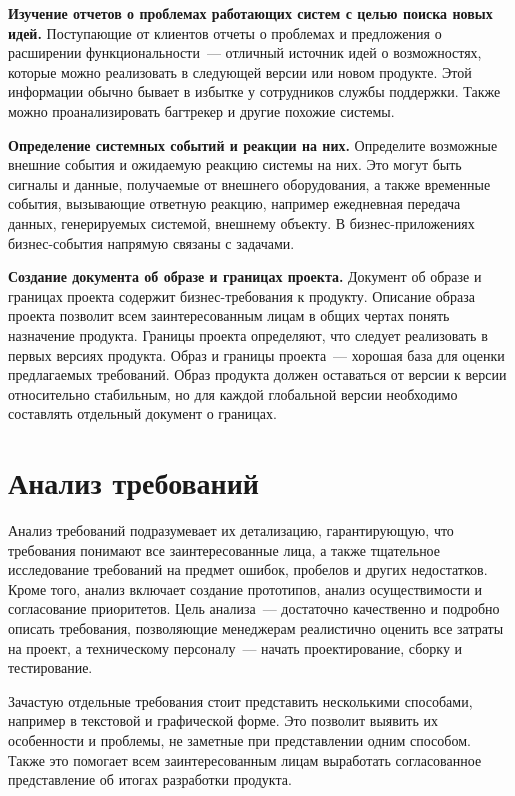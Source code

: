 \documentclass{../../text-style}
\begin{document}
\textbf{Изучение отчетов о проблемах работающих систем с целью поиска новых идей.} Поступающие от клиентов отчеты о проблемах и предложения о расширении функциональности~--- отличный источник идей о возможностях, которые можно реализовать в следующей версии или новом продукте. Этой информации обычно бывает в избытке у сотрудников службы поддержки. Также можно проанализировать багтрекер и другие похожие системы.

\textbf{Определение системных событий и реакции на них.} Определите возможные внешние события и ожидаемую реакцию системы на них. Это могут быть сигналы и данные, получаемые от внешнего оборудования, а также временные события, вызывающие ответную реакцию, например ежедневная передача данных, генерируемых системой, внешнему объекту. В бизнес-приложениях бизнес-события напрямую связаны с задачами.

\textbf{Создание документа об образе и границах проекта.} Документ об образе и границах проекта содержит бизнес-требования к продукту. Описание образа проекта позволит всем заинтересованным лицам в общих чертах понять назначение продукта. Границы проекта определяют, что следует реализовать в первых версиях продукта. Образ и границы проекта~--- хорошая база для оценки предлагаемых требований. Образ продукта должен оставаться от версии к версии относительно стабильным, но для каждой глобальной версии необходимо составлять отдельный документ о границах.

\section{Анализ требований}

Анализ требований подразумевает их детализацию, гарантирующую, что требования понимают все заинтересованные лица, а также тщательное исследование требований на предмет ошибок, пробелов и других недостатков. Кроме того, анализ включает создание прототипов, анализ осуществимости и согласование приоритетов. Цель анализа~--- достаточно качественно и подробно описать требования, позволяющие менеджерам реалистично оценить все затраты на проект, а техническому персоналу~--- начать проектирование, сборку и тестирование.

Зачастую отдельные требования стоит представить несколькими способами, например в текстовой и графической форме. Это позволит выявить их особенности и проблемы, не заметные при представлении одним способом. Также это помогает всем заинтересованным лицам выработать согласованное представление об итогах разработки продукта.
\end{document}
